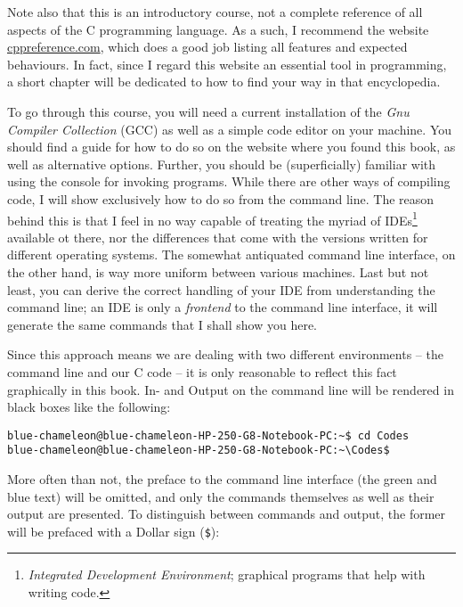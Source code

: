 Note also that this is an introductory course, not a complete reference of all aspects of the C programming language. As a such, I recommend the website \url{cppreference.com}, which does a good job listing all features and expected behaviours. In fact, since I regard this website an essential tool in programming, a short chapter will be dedicated to how to find your way in that encyclopedia.

To go through this course, you will need a current installation of the \emph{Gnu Compiler Collection} (GCC) as well as a simple code editor on your machine. You should find a guide for how to do so on the website where you found this book, as well as alternative options. Further, you should be (superficially) familiar with using the console for invoking programs. While there are other ways of compiling code, I will show exclusively how to do so from the command line. The reason behind this is that I feel in no way capable of treating the myriad of IDEs\footnote{\emph{Integrated Development Environment}; graphical programs that help with writing code.} available ot there, nor the differences that come with the versions written for different operating systems. The somewhat antiquated command line interface, on the other hand, is way more uniform between various machines. Last but not least, you can derive the correct handling of your IDE from understanding the command line; an IDE is only a \emph{frontend} to the command line interface, \ie it will generate the same commands that I shall show you here.

Since this approach means we are dealing with two different environments -- the command line and our C code -- it is only reasonable to reflect this fact graphically in this book. In- and Output on the command line will be rendered in black boxes like the following:
\begin{cmdbox}
\texttt{{\color{green}blue-chameleon@blue-chameleon-HP-250-G8-Notebook-PC}:{\color{blue}\textasciitilde}\$ cd Codes} \\
\texttt{{\color{green}blue-chameleon@blue-chameleon-HP-250-G8-Notebook-PC}:{\color{blue}\textasciitilde\textbackslash Codes}\$}
\end{cmdbox}

More often than not, the preface to the command line interface (the green and blue text) will be omitted, and only the commands themselves as well as their output are presented. To distinguish between commands and output, the former will be prefaced with a Dollar sign (\texttt{\$}):

